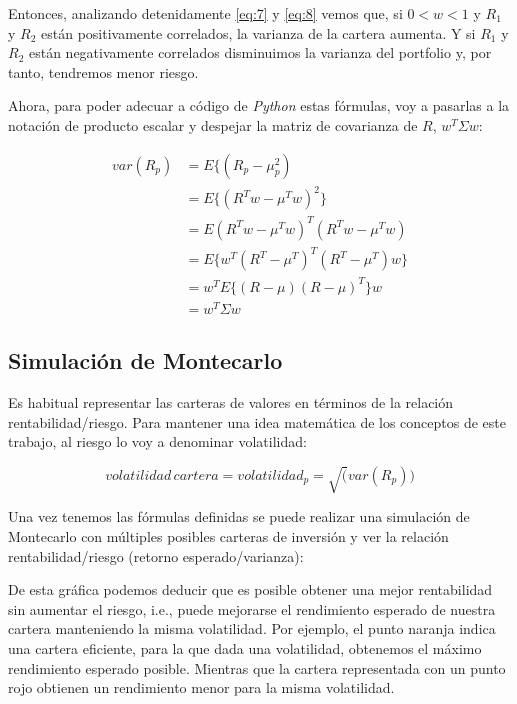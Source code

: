 Entonces, analizando detenidamente \ref{eq:7} y \ref{eq:8} vemos que, si $0 < w < 1$ y $R_{1}$ y $R_{2}$ están positivamente correlados, la varianza de la cartera aumenta. Y si $R_{1}$ y $R_{2}$ están negativamente correlados disminuimos la varianza del portfolio y, por tanto, tendremos menor riesgo. 

Ahora, para poder adecuar a código de \emph{Python} estas fórmulas, voy a pasarlas a la notación de producto escalar y despejar la matriz de covarianza de $R$, $w^{T}\Sigma w$:

\begin{equation} \label{eq:9}
\begin{aligned}
	var(R_{p}) &= E\{(R_{p}-\mu_{p}^{2})\\
	&= E\{(R^{T}w - \mu^{T}w)^{2}\} \\
	&= E{(R^{T}w - \mu^{T}w)^{T}(R^{T}w - \mu^{T}w)} \\
	&= E\{w^{T}(R^{T}-\mu^{T})^{T}(R^{T}-\mu^{T})w\} \\
	&= w^{T}E\{(R-\mu)(R-\mu)^{T}\}w \\
	&= w^{T}\Sigma w
\end{aligned}
\end{equation}

\subsection{Simulación de Montecarlo}

Es habitual representar las carteras de valores en términos de la relación rentabilidad/riesgo. Para mantener una idea matemática de los conceptos de este trabajo, al riesgo lo voy a denominar volatilidad:

\begin{equation}
	volatilidad\, cartera = volatilidad_{p} = \sqrt(var(R_{p}))
\end{equation}

Una vez tenemos las fórmulas definidas se puede realizar una simulación de Montecarlo \citep{simulacion_montecarlo} con múltiples posibles carteras de inversión y ver la relación rentabilidad/riesgo (retorno esperado/varianza):


De esta gráfica podemos deducir que es posible obtener una mejor rentabilidad sin aumentar el riesgo, i.e., puede mejorarse el rendimiento esperado de nuestra cartera manteniendo la misma volatilidad. Por ejemplo, el punto naranja indica una cartera eficiente, para la que dada una volatilidad, obtenemos el máximo rendimiento esperado posible. Mientras que la cartera representada con un punto rojo obtienen un rendimiento menor para la misma volatilidad. 

